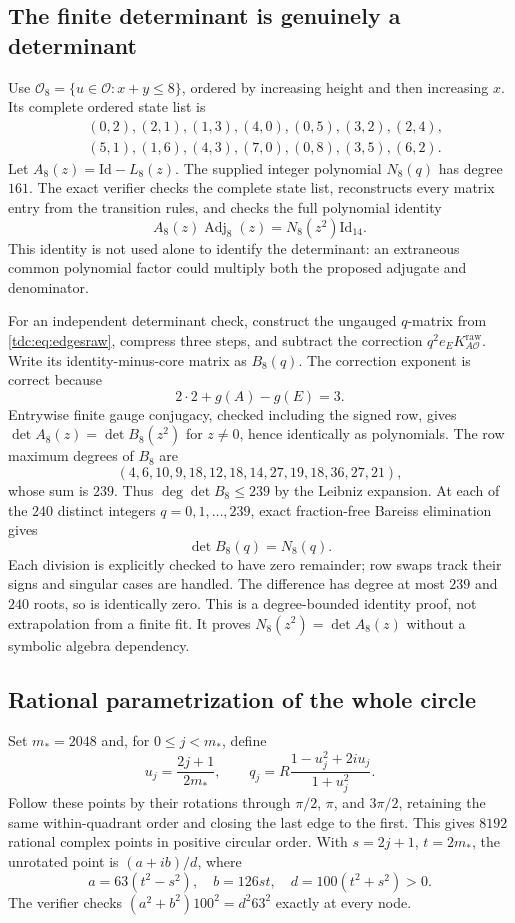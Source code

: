 \documentclass[11pt]{article}
\theoremstyle{definition}\newtheorem{definition}[theorem]{Definition}
\theoremstyle{remark}\newtheorem{remark}[theorem]{Remark}
\newcommand{\Id}{\mathrm{Id}}
\newcommand{\OO}{\mathcal O}
\begin{document}
\subsection{The finite determinant is genuinely a determinant}
Use $\OO_8=\{u\in\OO:x+y\le8\}$, ordered by increasing height and then increasing $x$. Its complete ordered state list is
\begin{align*}
 &(0,2),(2,1),(1,3),(4,0),(0,5),(3,2),(2,4),\\
 &(5,1),(1,6),(4,3),(7,0),(0,8),(3,5),(6,2).
\end{align*}
Let $A_8(z)=\Id-L_8(z)$. The supplied integer polynomial $N_8(q)$ has degree $161$. The exact verifier checks the complete state list, reconstructs every matrix entry from the transition rules, and checks the full polynomial identity
\begin{equation}\label{tdc:eq:adjugate}
 A_8(z)\operatorname{Adj}_8(z)=N_8(z^2)\Id_{14}.
\end{equation}
This identity is not used alone to identify the determinant: an extraneous common polynomial factor could multiply both the proposed adjugate and denominator.

For an independent determinant check, construct the ungauged $q$-matrix from \eqref{tdc:eq:edgesraw}, compress three steps, and subtract the correction $q^2e_E K^{\mathrm{raw}}_{A\OO}$. Write its identity-minus-core matrix as $B_8(q)$. The correction exponent is correct because
\[
 2\cdot2+g(A)-g(E)=3.
\]
Entrywise finite gauge conjugacy, checked including the signed row, gives
$\det A_8(z)=\det B_8(z^2)$ for $z\ne0$, hence identically as polynomials. The row maximum degrees of $B_8$ are
\[
 (4,6,10,9,18,12,18,14,27,19,18,36,27,21),
\]
whose sum is $239$. Thus $\deg\det B_8\le239$ by the Leibniz expansion. At each of the $240$ distinct integers $q=0,1,\ldots,239$, exact fraction-free Bareiss elimination gives
\[
 \det B_8(q)=N_8(q).
\]
Each division is explicitly checked to have zero remainder; row swaps track their signs and singular cases are handled. The difference has degree at most $239$ and $240$ roots, so is identically zero. This is a degree-bounded identity proof, not extrapolation from a finite fit. It proves $N_8(z^2)=\det A_8(z)$ without a symbolic algebra dependency.

\subsection{Rational parametrization of the whole circle}
Set $m_*=2048$ and, for $0\le j<m_*$, define
\begin{equation}\label{tdc:eq:rationalmesh}
 u_j=\frac{2j+1}{2m_*},\qquad
 q_j=R\frac{1-u_j^2+2iu_j}{1+u_j^2}.
\end{equation}
Follow these points by their rotations through $\pi/2$, $\pi$, and $3\pi/2$, retaining the same within-quadrant order and closing the last edge to the first. This gives $8192$ rational complex points in positive circular order. With $s=2j+1$, $t=2m_*$, the unrotated point is $(a+ib)/d$, where
\[
 a=63(t^2-s^2),\quad b=126st,\quad d=100(t^2+s^2)>0.
\]
The verifier checks $(a^2+b^2)100^2=d^2 63^2$ exactly at every node.
\end{document}
